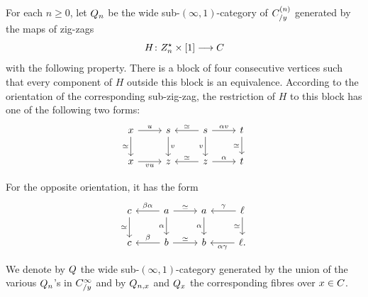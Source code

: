\documentclass[a4paper,reqno,twoside]{amsart}
\begin{document}
\begin{definition}\label{def:QnLocalizefibre}
	For each $n\geq0$, let $\relax{Q}_n$ be the wide sub-$(\infty,1)$-category of $\relax{C}^{(n)}_{/y}$ generated by the maps of zig-zags
	\[
		H\colon Z_n^{\star}\times[1]\longrightarrow\relax{C}
	\]
	with the following property. There is a block of four consecutive vertices such that every component of $H$ outside this block is an equivalence. According to the orientation of the corresponding sub-zig-zag, the restriction of $H$ to this block has one of the following two forms:
	\begin{equation}\label{eq:right}
		\begin{tikzcd}
	x & s & s & t \\
	x & z & z & t
	\arrow["u", from=1-1, to=1-2]
	\arrow["\simeq", swap, from=1-1, to=2-1]
	\arrow["v", from=1-2, to=2-2]
	\arrow["\simeq"', from=1-3, to=1-2]
	\arrow["\alpha v", from=1-3, to=1-4]
	\arrow["v"', from=1-3, to=2-3]
	\arrow[swap, "\simeq ",from=1-4, to=2-4]
	\arrow["{v u }"', from=2-1, to=2-2]
	\arrow["\simeq"', from=2-3, to=2-2]
	\arrow["\alpha", from=2-3, to=2-4]
\end{tikzcd}
	\end{equation}

	For the opposite orientation, it has the form
	\begin{equation}\label{eq:left}
		\begin{tikzcd}
	c & a & a & \ell \\
	c & b & b & \ell{.}
	\arrow[swap,"\simeq ", from=1-1, to=2-1]
	\arrow["{\beta\alpha}"', from=1-2, to=1-1]
	\arrow["\simeq", from=1-2, to=1-3]
	\arrow["\alpha"', from=1-2, to=2-2]
	\arrow["\alpha"', from=1-3, to=2-3]
	\arrow["\gamma"', from=1-4, to=1-3]
	\arrow[swap, "\simeq ", from=1-4, to=2-4]
	\arrow["\beta"', from=2-2, to=2-1]
	\arrow["\simeq", from=2-2, to=2-3]
	\arrow["{ \alpha \gamma}", from=2-4, to=2-3]
\end{tikzcd}
	\end{equation}

 We denote by $\relax{Q}$ the wide sub-$(\infty,1)$-category generated by the union of the various $\relax{Q}_n$'s in $\relax{C}^{\infty}_{/y}$ and by $\relax{Q}_{n,x}$ and $\relax{Q}_x$ the corresponding fibres  over $x \in \relax{C}$.
\end{definition}
\end{document}
